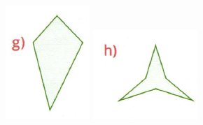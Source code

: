 \documentclass[a4paper,14pt]{article}
\begin{document}
\begin{multicols}{2}
\begin{enumerate}
			\includegraphics[width=1\linewidth]{6FMA88_imagens/imagem7}
			\includegraphics[width=1\linewidth]{6FMA88_imagens/imagem8}

\end{enumerate}
\end{multicols}
\end{document}

